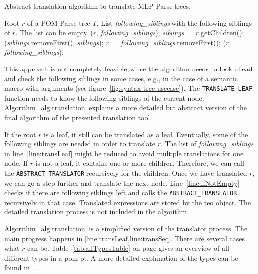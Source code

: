 \begin{algorithm}[H]
\caption{Abstract translation algorithm to translate MLP-Parse trees.}\label{alg:translation}
	\begin{algorithmic}[1]
	\Require Root $r$ of a POM-Parse tree $T$. List \textit{following\_siblings} with the following siblings of $r$. The list can be empty.
		($r$, \textit{following\_siblings});\label{line:transLeaf}
	\Else
		\State \textit{siblings} $ = r$.getChildren(); 
		(\textit{siblings}.removeFirst(), \textit{siblings});\label{line:transSeq}
	\EndIf
	\label{line:ifNotEmpty}
		\State $r =$ \textit{following\_siblings}.removeFirst();
		($r$, \textit{following\_siblings});
	\EndIf
	\EndProcedure
	\end{algorithmic}
\end{algorithm}
\vspace{-20px}

This approach is not completely feasible, since the algorithm needs to look ahead and check the following siblings in some cases, e.g., in the case of a semantic macro with arguments (see figure~\ref{fig:syntax-tree-usecase}). The {\footnotesize \verb|TRANSLATE_LEAF|} function needs to know the following siblings of the current node. Algorithm~\ref{alg:translation} explains a more detailed but abstract version of the final algorithm of the presented translation tool. 

If the root $r$ is a leaf, it still can be translated as a leaf. Eventually, some of the following siblings are needed in order to translate $r$. The list of \textit{following\_siblings} in line~\ref{line:transLeaf} might be reduced to avoid multiple translations for one node. If $r$ is not a leaf, it contains one or more children. Therefore, we can call the {\footnotesize \verb|ABSTRACT_TRANSLATOR|} recursively for the children. Once we have translated $r$, we can go a step further and translate the next node. Line~\ref{line:ifNotEmpty} checks if there are following siblings left and calls the {\footnotesize \verb|ABSTRACT_TRANSLATOR|} recursively in that case. Translated expressions are stored by the \gls*{teo} object. The detailed translation process is not included in the algorithm.

Algorithm~\ref{alg:translation} is a simplified version of the translator process. The main progress happens in \cref{line:transLeaf,line:transSeq}. There are several cases what $r$ can be. Table~\ref{tab:allTypesTable} on page \pageref{tab:allTypesTable} gives an overview of all different types in a \gls*{pom-pt}. A more detailed explanation of the types can be found in~\parencite{POM-Tagger}.

